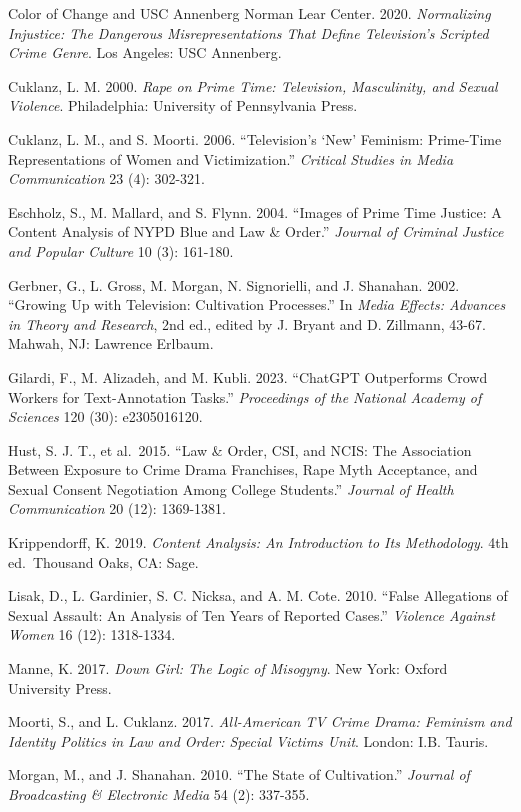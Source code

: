 \documentclass[
]{article}
\begin{document}
Color of Change and USC Annenberg Norman Lear Center. 2020.
\emph{Normalizing Injustice: The Dangerous Misrepresentations That
Define Television's Scripted Crime Genre}. Los Angeles: USC Annenberg.

Cuklanz, L. M. 2000. \emph{Rape on Prime Time: Television, Masculinity,
and Sexual Violence}. Philadelphia: University of Pennsylvania Press.

Cuklanz, L. M., and S. Moorti. 2006. ``Television's `New' Feminism:
Prime-Time Representations of Women and Victimization.'' \emph{Critical
Studies in Media Communication} 23 (4): 302-321.

Eschholz, S., M. Mallard, and S. Flynn. 2004. ``Images of Prime Time
Justice: A Content Analysis of NYPD Blue and Law \& Order.''
\emph{Journal of Criminal Justice and Popular Culture} 10 (3): 161-180.

Gerbner, G., L. Gross, M. Morgan, N. Signorielli, and J. Shanahan. 2002.
``Growing Up with Television: Cultivation Processes.'' In \emph{Media
Effects: Advances in Theory and Research}, 2nd ed., edited by J. Bryant
and D. Zillmann, 43-67. Mahwah, NJ: Lawrence Erlbaum.

Gilardi, F., M. Alizadeh, and M. Kubli. 2023. ``ChatGPT Outperforms
Crowd Workers for Text-Annotation Tasks.'' \emph{Proceedings of the
National Academy of Sciences} 120 (30): e2305016120.

Hust, S. J. T., et al.~2015. ``Law \& Order, CSI, and NCIS: The
Association Between Exposure to Crime Drama Franchises, Rape Myth
Acceptance, and Sexual Consent Negotiation Among College Students.''
\emph{Journal of Health Communication} 20 (12): 1369-1381.

Krippendorff, K. 2019. \emph{Content Analysis: An Introduction to Its
Methodology}. 4th ed.~Thousand Oaks, CA: Sage.

Lisak, D., L. Gardinier, S. C. Nicksa, and A. M. Cote. 2010. ``False
Allegations of Sexual Assault: An Analysis of Ten Years of Reported
Cases.'' \emph{Violence Against Women} 16 (12): 1318-1334.

Manne, K. 2017. \emph{Down Girl: The Logic of Misogyny}. New York:
Oxford University Press.

Moorti, S., and L. Cuklanz. 2017. \emph{All-American TV Crime Drama:
Feminism and Identity Politics in Law and Order: Special Victims Unit}.
London: I.B. Tauris.

Morgan, M., and J. Shanahan. 2010. ``The State of Cultivation.''
\emph{Journal of Broadcasting \& Electronic Media} 54 (2): 337-355.
\end{document}
